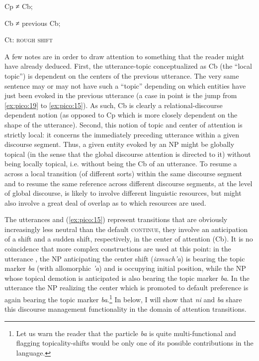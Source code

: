 \documentclass[output=paper
,modfonts
,nonflat]{langsci/langscibook}
\begin{document}
Cp ≠ Cb;

Cb ≠ previous Cb; 

Ct: \textsc{rough shift}
\z

A few notes are in order to draw attention to something that the reader might have already deduced. First, the utterance-topic conceptualized as Cb (the ``local topic'') is dependent on the centers of the previous utterance. The very same sentence may or may not have such a ``topic'' depending on which entities have just been evoked in the previous utterance (a case in point is the jump from \ref{ex:pico:19} to \ref{ex:pico:15}). As such, Cb is clearly a relational-discourse dependent notion (as opposed to Cp which is more closely dependent on the shape of the utterance).
Second, this notion of topic and center of attention is strictly local: it concerns the immediately preceding utterance within a given discourse segment. Thus, a given entity evoked by an NP might be globally topical (in the sense that the global discourse attention is directed to it) without being locally topical, i.e. without being the Cb of an utterance. To resume a  across a local transition (of different sorts) within the same discourse segment and to resume the same reference across different discourse segments, at the level of global discourse, is likely to involve different linguistic resources, but might also involve a great deal of overlap as to which resources are used.

The utterances  and (\ref{ex:pico:15}) represent transitions that are obviously increasingly less neutral than the default \textsc{continue}, they involve an anticipation of a shift and a sudden shift, respectively, in the center of attention (Cb). 
It is no coincidence that more complex constructions are used at this point: in the utterance , the NP anticipating the center shift (\textit{ixmuch'a}) is bearing the topic marker \textit{ba} (with allomorphic \textit{'a}) and is occupying initial position, while the NP whose topical demotion is anticipated is also bearing the topic marker \textit{ba}. In the utterance  the NP realizing the center which is promoted to default preference is again bearing the topic marker \textit{ba}.\footnote{Let us warn the reader that the particle \textit{ba} is quite multi-functional and flagging topicality-shifts would be only one of its possible contributions in the language.} In  below, I will show that \textit{ni} and \textit{ba} share this discourse management functionality in the domain of attention transitions.
\end{document}
